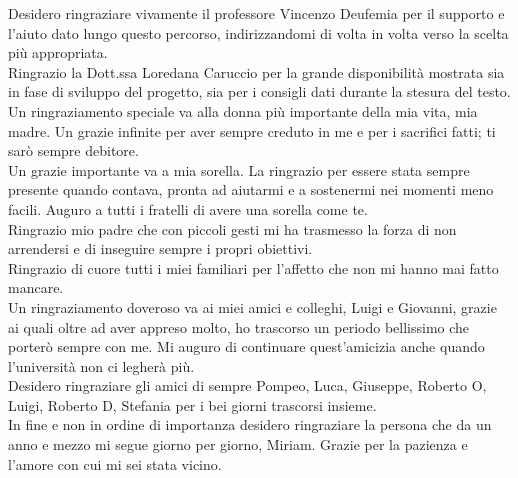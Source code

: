 Desidero ringraziare vivamente il professore Vincenzo Deufemia per il supporto e l'aiuto dato lungo questo percorso, indirizzandomi di volta in volta verso la scelta più appropriata.\\
Ringrazio la Dott.ssa Loredana Caruccio per la grande disponibilità mostrata sia in fase di sviluppo del progetto, sia per i consigli dati durante la stesura del testo.\\
Un ringraziamento speciale va alla donna più importante della mia vita, mia madre. Un grazie infinite per aver sempre creduto in me e per i sacrifici fatti; ti sarò sempre debitore.\\
Un grazie importante va a mia sorella. La ringrazio per essere stata sempre presente quando contava, pronta ad aiutarmi e a sostenermi nei momenti meno facili. Auguro a tutti i fratelli di avere una sorella come te.\\
Ringrazio mio padre che con piccoli gesti mi ha trasmesso la forza di non arrendersi e di inseguire sempre i propri obiettivi.\\
Ringrazio di cuore tutti i miei familiari per l'affetto che non mi hanno mai fatto mancare.\\
Un ringraziamento doveroso va ai miei amici e colleghi, Luigi e Giovanni, grazie ai quali oltre ad aver appreso molto, ho trascorso un periodo bellissimo che porterò sempre con me. Mi auguro di continuare quest'amicizia anche quando l'università non ci legherà più.\\
Desidero ringraziare gli amici di sempre Pompeo, Luca, Giuseppe, Roberto O, Luigi, Roberto D, Stefania per i bei giorni trascorsi insieme.\\
In fine e non in ordine di importanza desidero ringraziare la persona che da un anno e mezzo mi segue giorno per giorno, Miriam. Grazie per la pazienza e l'amore con cui mi sei stata vicino.